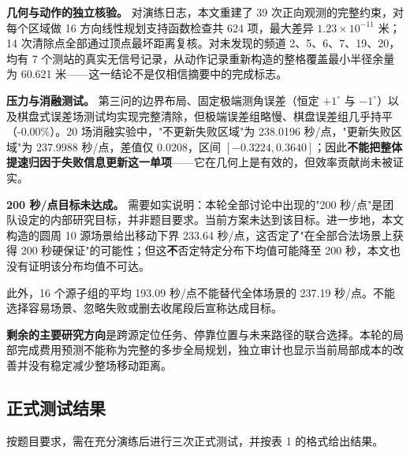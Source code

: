 \textbf{几何与动作的独立核验。} 对演练日志，本文重建了 39 次正向观测的完整约束，对每个区域做 16 方向线性规划支持函数检查共 624 项，最大差异 $1.23\times10^{-11}$ 米；14 次清除点全部通过顶点最坏距离复核。对未发现的频道 2、5、6、7、19、20，均有 7 个测站的真实无信号记录，从动作记录重新构造的整格覆盖最小半径余量为 60.621 米——这一结论不是仅相信摘要中的完成标志。

\textbf{压力与消融测试。} 第三问的边界布局、固定极端测角误差（恒定 $+1^\circ$ 与 $-1^\circ$）以及棋盘式误差场测试均实现完整清除，但极端误差组略慢、棋盘误差组几乎持平（-0.00\%）。20 场消融实验中，"不更新失败区域"为 238.0196 秒/点，"更新失败区域"为 237.9988 秒/点，差值仅 0.0208，区间 $[-0.3224,0.3640]$；因此\textbf{不能把整体提速归因于失败信息更新这一单项}——它在几何上是有效的，但效率贡献尚未被证实。

\textbf{200 秒/点目标未达成。} 需要如实说明：本轮全部讨论中出现的"200 秒/点"是团队设定的内部研究目标，并非题目要求。当前方案未达到该目标。进一步地，本文构造的圆周 10 源场景给出移动下界 233.64 秒/点，这否定了"在全部合法场景上获得 200 秒硬保证"的可能性；但这\textbf{不}否定特定分布下均值可能降至 200 秒，本文也没有证明该分布均值不可达。

此外，16 个源子组的平均 193.09 秒/点不能替代全体场景的 237.19 秒/点。不能选择容易场景、忽略失败或删去收尾段后宣称达成目标。

\textbf{剩余的主要研究方向}是跨源定位任务、停靠位置与未来路径的联合选择。本轮的局部完成费用预测不能称为完整的多步全局规划，独立审计也显示当前局部成本的改善并没有稳定减少整场移动距离。

\subsection{正式测试结果}

按题目要求，需在充分演练后进行三次正式测试，并按表 1 的格式给出结果。

